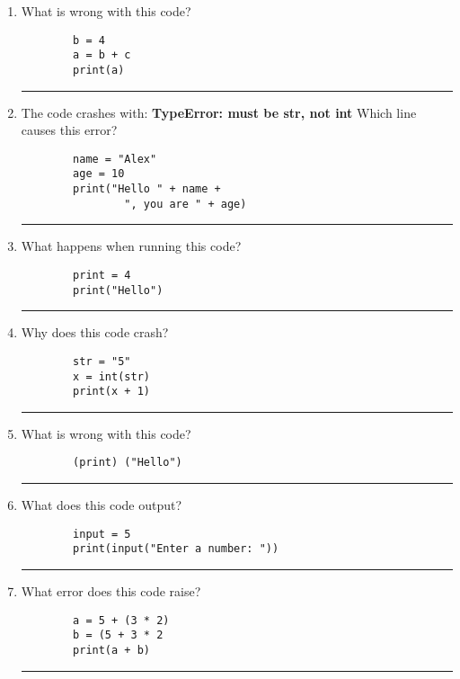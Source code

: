 \documentclass{article}
\begin{document}
\begin{multicols*}{2}
    \begin{enumerate}
        \item What is wrong with this code?
        \begin{lstlisting}
        b = 4
        a = b + c
        print(a)
        \end{lstlisting}
        \rule{\linewidth}{0.4pt} %

        \item The code crashes with:  
        \textbf{TypeError: must be str, not int}  
        Which line causes this error?  
        \begin{lstlisting}
        name = "Alex"
        age = 10
        print("Hello " + name + 
                ", you are " + age)
        \end{lstlisting}

        \rule{\linewidth}{0.4pt} %

        \item What happens when running this code?
        \begin{lstlisting}
        print = 4
        print("Hello")
        \end{lstlisting}
        \rule{\linewidth}{0.4pt} %

        \item Why does this code crash?
        \begin{lstlisting}
        str = "5"
        x = int(str)
        print(x + 1)
        \end{lstlisting}
        \rule{\linewidth}{0.4pt} %

        \item What is wrong with this code?
        \begin{lstlisting}
        (print) ("Hello")
        \end{lstlisting}
        \rule{\linewidth}{0.4pt} %

        \item What does this code output?
        \begin{lstlisting}
        input = 5
        print(input("Enter a number: "))
        \end{lstlisting}
        \rule{\linewidth}{0.4pt} %

        \item What error does this code raise?
        \begin{lstlisting}
        a = 5 + (3 * 2)
        b = (5 + 3 * 2
        print(a + b)
        \end{lstlisting}
        \rule{\linewidth}{0.4pt} %


\end{enumerate}
\end{multicols*}
\end{document}
